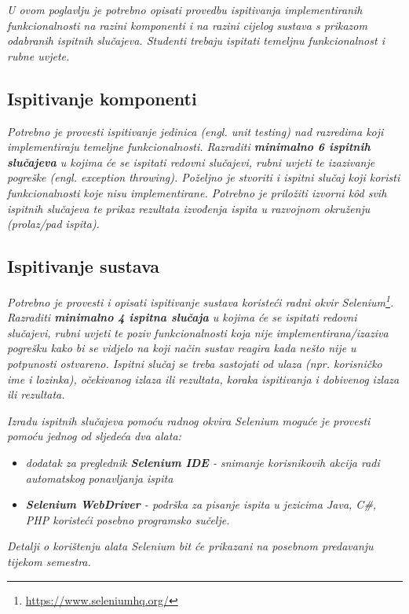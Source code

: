 			 \textit{U ovom poglavlju je potrebno opisati provedbu ispitivanja implementiranih funkcionalnosti na razini komponenti i na razini cijelog sustava s prikazom odabranih ispitnih slučajeva. Studenti trebaju ispitati temeljnu funkcionalnost i rubne uvjete.}
	
			
			\subsection{Ispitivanje komponenti}
			\textit{Potrebno je provesti ispitivanje jedinica (engl. unit testing) nad razredima koji implementiraju temeljne funkcionalnosti. Razraditi \textbf{minimalno 6 ispitnih slučajeva} u kojima će se ispitati redovni slučajevi, rubni uvjeti te izazivanje pogreške (engl. exception throwing). Poželjno je stvoriti i ispitni slučaj koji koristi funkcionalnosti koje nisu implementirane. Potrebno je priložiti izvorni kôd svih ispitnih slučajeva te prikaz rezultata izvođenja ispita u razvojnom okruženju (prolaz/pad ispita). }
			
			
			
			\subsection{Ispitivanje sustava}
			
			 \textit{Potrebno je provesti i opisati ispitivanje sustava koristeći radni okvir Selenium\footnote{\url{https://www.seleniumhq.org/}}. Razraditi \textbf{minimalno 4 ispitna slučaja} u kojima će se ispitati redovni slučajevi, rubni uvjeti te poziv funkcionalnosti koja nije implementirana/izaziva pogrešku kako bi se vidjelo na koji način sustav reagira kada nešto nije u potpunosti ostvareno. Ispitni slučaj se treba sastojati od ulaza (npr. korisničko ime i lozinka), očekivanog izlaza ili rezultata, koraka ispitivanja i dobivenog izlaza ili rezultata.\\ }
			 
			 \textit{Izradu ispitnih slučajeva pomoću radnog okvira Selenium moguće je provesti pomoću jednog od sljedeća dva alata:}
			 \begin{itemize}
			 	\item \textit{dodatak za preglednik \textbf{Selenium IDE} - snimanje korisnikovih akcija radi automatskog ponavljanja ispita	}
			 	\item \textit{\textbf{Selenium WebDriver} - podrška za pisanje ispita u jezicima Java, C\#, PHP koristeći posebno programsko sučelje.}
			 \end{itemize}
		 	\textit{Detalji o korištenju alata Selenium bit će prikazani na posebnom predavanju tijekom semestra.}
			
